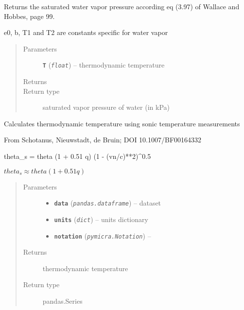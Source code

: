 \documentclass[a4paper,10pt,oneside]{sphinxmanual}
\begin{document}
\begin{fulllineitems}
\label{pymicra:pymicra.physics.satWaterPressure}
Returns the saturated water vapor pressure according eq (3.97) of Wallace and Hobbes, page 99.

e0, b, T1 and T2 are constants specific for water vapor
\begin{quote}\begin{description}
\item[{Parameters}] \leavevmode
\textbf{\texttt{T}} (\emph{\texttt{float}}) -- thermodynamic temperature

\item[{Returns}] \leavevmode


\item[{Return type}] \leavevmode
saturated vapor pressure of water (in kPa)

\end{description}\end{quote}

\end{fulllineitems}


\begin{fulllineitems}
\label{pymicra:pymicra.physics.theta_from_theta_s}
Calculates thermodynamic temperature using sonic temperature measurements

From Schotanus, Nieuwstadt, de Bruin; DOI 10.1007/BF00164332

theta\_s = theta (1 + 0.51 q) (1 - (vn/c)**2)\textasciicircum{}0.5

\(theta_s \approx theta (1 + 0.51 q)\)
\begin{quote}\begin{description}
\item[{Parameters}] \leavevmode\begin{itemize}
\item {} 
\textbf{\texttt{data}} (\emph{\texttt{pandas.dataframe}}) -- dataset

\item {} 
\textbf{\texttt{units}} (\emph{\texttt{dict}}) -- units dictionary

\item {} 
\textbf{\texttt{notation}} (\emph{\texttt{pymicra.Notation}}) -- 

\end{itemize}

\item[{Returns}] \leavevmode
thermodynamic temperature

\item[{Return type}] \leavevmode
pandas.Series

\end{description}\end{quote}

\end{fulllineitems}
\end{document}
